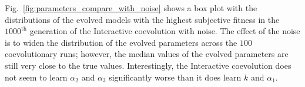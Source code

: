 Fig.~\ref{fig:parameters_compare_with_noise} shows a box plot with the distributions of the evolved models with the highest subjective fitness in the $1000^\textrm{th}$ generation of the Interactive coevolution with noise. The effect of the noise is to widen the distribution of the evolved parameters across the $100$ coevolutionary runs; however, the median values of the evolved parameters are still very close to the true values. Interestingly, the Interactive coevolution does not seem to learn $\alpha_2$ and $\alpha_3$ significantly worse than it does learn $k$ and $\alpha_1$. 

%
